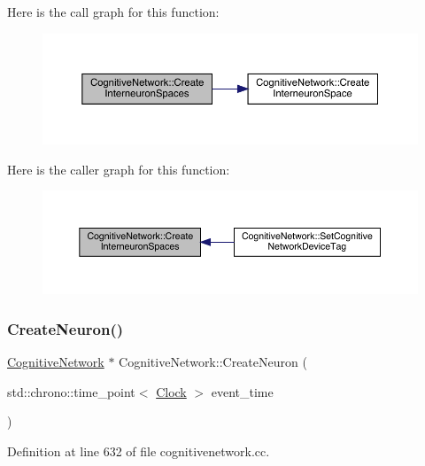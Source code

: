 Here is the call graph for this function\+:
\nopagebreak
\begin{figure}[H]
\begin{center}
\leavevmode
\includegraphics[width=350pt]{class_cognitive_network_a2d671451d659079d5efb5cda10e48827_cgraph}
\end{center}
\end{figure}
Here is the caller graph for this function\+:
\nopagebreak
\begin{figure}[H]
\begin{center}
\leavevmode
\includegraphics[width=350pt]{class_cognitive_network_a2d671451d659079d5efb5cda10e48827_icgraph}
\end{center}
\end{figure}
\mbox{\label{class_cognitive_network_a9b5fcaf824d5b587775e7c44630affe6}} 
\subsubsection{\texorpdfstring{Create\+Neuron()}{CreateNeuron()}}
{\footnotesize\ttfamily \hyperlink{class_cognitive_network}{Cognitive\+Network} $\ast$ Cognitive\+Network\+::\+Create\+Neuron (\begin{DoxyParamCaption}\item[{std\+::chrono\+::time\+\_\+point$<$ \hyperlink{universe_8h_a0ef8d951d1ca5ab3cfaf7ab4c7a6fd80}{Clock} $>$}]{event\+\_\+time }\end{DoxyParamCaption})}



Definition at line 632 of file cognitivenetwork.\+cc.

